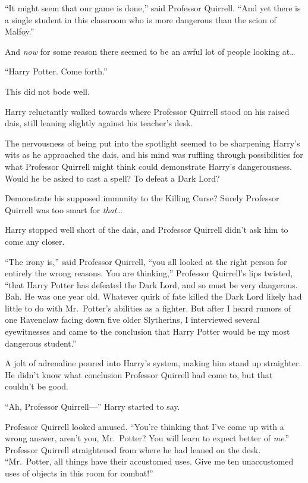 ``It might seem that our game is done,'' said Professor Quirrell. ``And
yet there is a single student in this classroom who is more dangerous
than the scion of Malfoy.''

And \emph{now} for some reason there seemed to be an awful lot of people
looking at\ldots{}

``Harry Potter. Come forth.''

This did not bode well.

Harry reluctantly walked towards where Professor Quirrell stood on his
raised dais, still leaning slightly against his teacher's desk.

The nervousness of being put into the spotlight seemed to be sharpening
Harry's wits as he approached the dais, and his mind was ruffling
through possibilities for what Professor Quirrell might think could
demonstrate Harry's dangerousness. Would he be asked to cast a spell? To
defeat a Dark Lord?

Demonstrate his supposed immunity to the Killing Curse? Surely Professor
Quirrell was too smart for \emph{that}\ldots{}

Harry stopped well short of the dais, and Professor Quirrell didn't ask
him to come any closer.

``The irony is,'' said Professor Quirrell, ``you all looked at the right
person for entirely the wrong reasons. You are thinking,'' Professor
Quirrell's lips twisted, ``that Harry Potter has defeated the Dark Lord,
and so must be very dangerous. Bah. He was one year old. Whatever quirk
of fate killed the Dark Lord likely had little to do with Mr.~Potter's
abilities as a fighter. But after I heard rumors of one Ravenclaw facing
down five older Slytherins, I interviewed several eyewitnesses and came
to the conclusion that Harry Potter would be my most dangerous
student.''

A jolt of adrenaline poured into Harry's system, making him stand up
straighter. He didn't know what conclusion Professor Quirrell had come
to, but that couldn't be good.

``Ah, Professor Quirrell---'' Harry started to say.

Professor Quirrell looked amused. ``You're thinking that I've come up
with a wrong answer, aren't you, Mr.~Potter? You will learn to expect
better of \emph{me}.'' Professor Quirrell straightened from where he had
leaned on the desk. ``Mr.~Potter, all things have their accustomed uses.
Give me ten unaccustomed uses of objects in this room for combat!''

